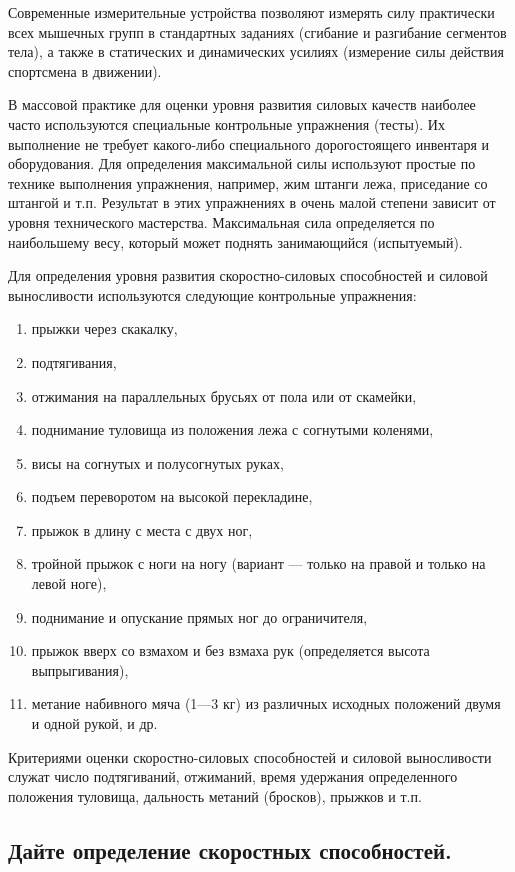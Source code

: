 Современные измерительные устройства позволяют измерять силу практически всех мышечных групп в стандартных заданиях (сгибание и разгибание сегментов тела), а также в статических и динамических усилиях (измерение силы действия спортсмена в движении).

В массовой практике для оценки уровня развития силовых качеств наиболее часто используются специальные контрольные упражнения (тесты). Их выполнение не требует какого-либо специального дорогостоящего инвентаря и оборудования. Для определения максимальной силы используют простые по технике выполнения упражнения, например, жим штанги лежа, приседание со штангой и т.п. Результат в этих упражнениях в очень малой степени зависит от уровня технического мастерства. Максимальная сила определяется по наибольшему весу, который может поднять занимающийся (испытуемый).

Для определения уровня развития скоростно-силовых способностей и силовой выносливости используются следующие контрольные упражнения:
\begin{enumerate}
    \item прыжки через скакалку,
    \item подтягивания,
    \item отжимания на параллельных брусьях от пола или от скамейки,
    \item поднимание туловища из положения лежа с согнутыми коленями,
    \item висы на согнутых и полусогнутых руках,
    \item подъем переворотом на высокой перекладине,
    \item прыжок в длину с места с двух ног,
    \item тройной прыжок с ноги на ногу (вариант — только на правой и только на левой ноге),
    \item поднимание и опускание прямых ног до ограничителя,
    \item прыжок вверх со взмахом и без взмаха рук (определяется высота выпрыгивания),
    \item метание набивного мяча (1—3 кг) из различных исходных положений двумя и одной рукой, и др.
\end{enumerate}

Критериями оценки скоростно-силовых способностей и силовой выносливости служат число подтягиваний, отжиманий, время удержания определенного положения туловища, дальность метаний (бросков), прыжков и т.п.


\subsection{Дайте определение скоростных способностей.}

